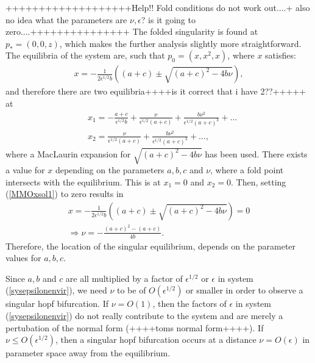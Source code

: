 +++++++++++++++++++Help!! Fold conditions do not work out....+ also no idea what the parameters are $\nu, \epsilon$? is it going to zero....+++++++++++++++
The folded singularity is found at $p_*= (0,0,z)$, which makes the further analysis slightly more straightforward.
The equilibria of the system are, such that $p_0= (x,x^2,x)$, where $x$ satisfies:
\begin{align}\label{MMOxsol1}
x = -\frac{1}{2 \epsilon^{1/2} b} \left( (a+c) \pm \sqrt{ (a+c)^2 - 4 b \nu } \right),
\end{align}
and therefore there are two equilibria++++is it correct that i have 2??+++++ at
\begin{align*}
&x_1=-\frac{a+c}{ \epsilon^{1/2} b} + \frac{\nu}{\epsilon^{1/2} (a+c)} + \frac{b \nu^2}{\epsilon^{1/2} (a+c)^3} + ... \\
&x_2= \frac{\nu}{\epsilon^{1/2} (a+c)} + \frac{b \nu^2}{\epsilon^{1/2} (a+c)^3} + ...,
\end{align*}
where a MacLaurin expansion for $\sqrt{ (a+c)^2 - 4 b \nu }$ has been used.
There exists a value for $x$ depending on the parameters $a,b,c$ and $\nu$, where a fold point intersects with the equilibrium. This is at $x_1=0$ and $x_2=0$.
Then, setting (\ref{MMOxsol1}) to zero results in
\begin{align*}
x=-\frac{1}{2 \epsilon^{1/2} b} \left( (a+c) \pm \sqrt{ (a+c)^2 - 4 b \nu } \right)=0\\
\Rightarrow \nu = - \frac{ (a+c)^2 - (a+c)}{4b}.
\end{align*}
Therefore, the location of the singular equilibrium, depends on the parameter values for $a,b,c$.

Since $a, b$ and $c$ are all multiplied by a factor of $\epsilon^{1/2}$ or $\epsilon$ in system (\ref{sysepsilonenvir}), we need $\nu$ to be of $O(\epsilon^{1/2})$ or smaller in order to observe a singular hopf bifurcation.
If $\nu=O(1)$, then the factors of $\epsilon$ in system (\ref{sysepsilonenvir}) do not really contribute to the system and are merely a pertubation of the normal form (++++toms normal form++++).
If $\nu \leq O(\epsilon^{1/2})$, then a singular hopf bifurcation occurs at a distance $\nu =O(\epsilon)$ in parameter space away from the equilibrium.

